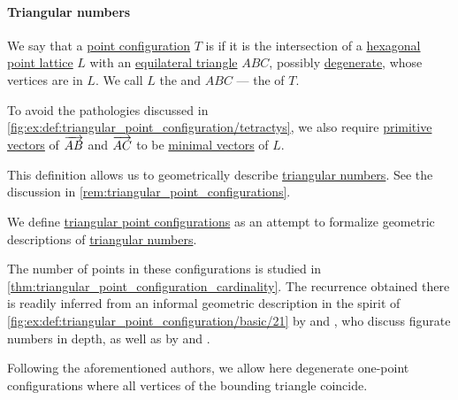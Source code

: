 \paragraph{Triangular numbers}

\begin{definition}\label{def:triangular_point_configuration}\mimprovised
  We say that a \hyperref[def:point_configuration]{point configuration} \( T \) is  if it is the intersection of a \hyperref[def:hexagonal_point_lattice]{hexagonal point lattice} \( L \) with an \hyperref[def:triangle/equilateral]{equilateral triangle} \( ABC \), possibly \hyperref[def:degenerate_polytope]{degenerate}, whose vertices are in \( L \). We call \( L \) the  and \( ABC \) --- the  of \( T \).

  To avoid the pathologies discussed in \cref{fig:ex:def:triangular_point_configuration/tetractys}, we also require \hyperref[def:primitive_lattice_vector]{primitive vectors} of \( \overrightarrow{AB} \) and \( \overrightarrow{AC} \) to be \hyperref[def:minimal_lattice_vector]{minimal vectors} of \( L \).
\end{definition}
\begin{comments}
  \item This definition allows us to geometrically describe \hyperref[def:triangular_number]{triangular numbers}. See the discussion in \cref{rem:triangular_point_configurations}.
\end{comments}

\begin{remark}\label{rem:triangular_point_configurations}
  We define \hyperref[def:triangular_point_configuration]{triangular point configurations} as an attempt to formalize geometric descriptions of \hyperref[def:triangular_number]{triangular numbers}.

  The number of points in these configurations is studied in \cref{thm:triangular_point_configuration_cardinality}. The recurrence obtained there is readily inferred from an informal geometric description in the spirit of \cref{fig:ex:def:triangular_point_configuration/basic/21} by  and , who discuss figurate numbers in depth, as well as by  and .

  Following the aforementioned authors, we allow here degenerate one-point configurations where all vertices of the bounding triangle coincide.
\end{remark}

